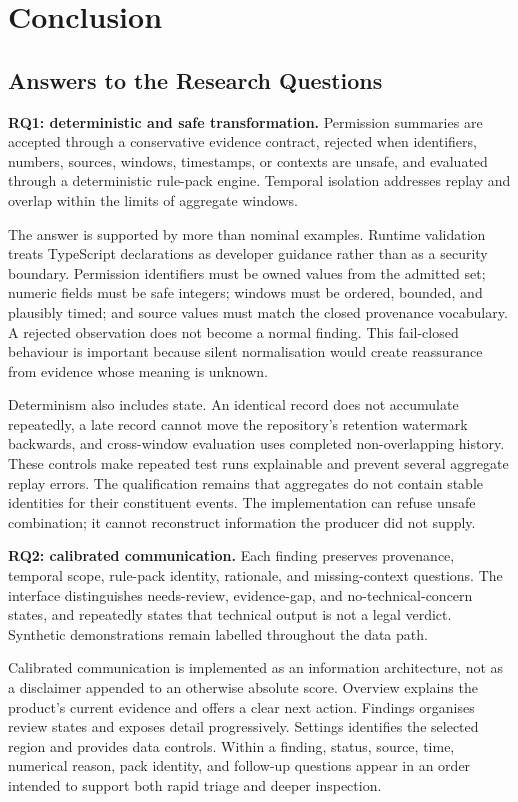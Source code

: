 \section{Conclusion}

\subsection{Answers to the Research Questions}

\textbf{RQ1: deterministic and safe transformation.} Permission summaries are accepted through a conservative evidence contract, rejected when identifiers, numbers, sources, windows, timestamps, or contexts are unsafe, and evaluated through a deterministic rule-pack engine. Temporal isolation addresses replay and overlap within the limits of aggregate windows.

The answer is supported by more than nominal examples. Runtime validation treats TypeScript declarations as developer guidance rather than as a security boundary. Permission identifiers must be owned values from the admitted set; numeric fields must be safe integers; windows must be ordered, bounded, and plausibly timed; and source values must match the closed provenance vocabulary. A rejected observation does not become a normal finding. This fail-closed behaviour is important because silent normalisation would create reassurance from evidence whose meaning is unknown.

Determinism also includes state. An identical record does not accumulate repeatedly, a late record cannot move the repository's retention watermark backwards, and cross-window evaluation uses completed non-overlapping history. These controls make repeated test runs explainable and prevent several aggregate replay errors. The qualification remains that aggregates do not contain stable identities for their constituent events. The implementation can refuse unsafe combination; it cannot reconstruct information the producer did not supply.

\textbf{RQ2: calibrated communication.} Each finding preserves provenance, temporal scope, rule-pack identity, rationale, and missing-context questions. The interface distinguishes needs-review, evidence-gap, and no-technical-concern states, and repeatedly states that technical output is not a legal verdict. Synthetic demonstrations remain labelled throughout the data path.

Calibrated communication is implemented as an information architecture, not as a disclaimer appended to an otherwise absolute score. Overview explains the product's current evidence and offers a clear next action. Findings organises review states and exposes detail progressively. Settings identifies the selected region and provides data controls. Within a finding, status, source, time, numerical reason, pack identity, and follow-up questions appear in an order intended to support both rapid triage and deeper inspection.

